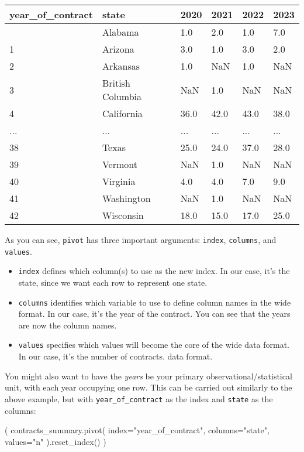 \documentclass[
  letterpaper,
  DIV=11,
  numbers=noendperiod]{scrreprt}
\newenvironment{Shaded}{\begin{snugshade}}{\end{snugshade}}
\newcommand{\NormalTok}[1]{\textcolor[rgb]{0.00,0.23,0.31}{#1}}
\newcommand{\OperatorTok}[1]{\textcolor[rgb]{0.37,0.37,0.37}{#1}}
\newcommand{\StringTok}[1]{\textcolor[rgb]{0.13,0.47,0.30}{#1}}
\providecommand{\tightlist}{%
  \setlength{\itemsep}{0pt}\setlength{\parskip}{0pt}}\usepackage{longtable,booktabs,array}
\begin{document}
\begin{longtable}[]{@{}llllll@{}}
\toprule\noalign{}
year\_of\_contract & state & 2020 & 2021 & 2022 & 2023 \\
\midrule\noalign{}
\endhead
\bottomrule\noalign{}
\endlastfoot
0 & Alabama & 1.0 & 2.0 & 1.0 & 7.0 \\
1 & Arizona & 3.0 & 1.0 & 3.0 & 2.0 \\
2 & Arkansas & 1.0 & NaN & 1.0 & NaN \\
3 & British Columbia & NaN & 1.0 & NaN & NaN \\
4 & California & 36.0 & 42.0 & 43.0 & 38.0 \\
... & ... & ... & ... & ... & ... \\
38 & Texas & 25.0 & 24.0 & 37.0 & 28.0 \\
39 & Vermont & NaN & 1.0 & NaN & NaN \\
40 & Virginia & 4.0 & 4.0 & 7.0 & 9.0 \\
41 & Washington & NaN & 1.0 & NaN & NaN \\
42 & Wisconsin & 18.0 & 15.0 & 17.0 & 25.0 \\
\end{longtable}

As you can see, \texttt{pivot} has three important arguments:
\texttt{index}, \texttt{columns}, and \texttt{values}.

\begin{itemize}
\tightlist
\item
  \texttt{index} defines which column(s) to use as the new index. In our
  case, it's the state, since we want each row to represent one state.
\item
  \texttt{columns} identifies which variable to use to define column
  names in the wide format. In our case, it's the year of the contract.
  You can see that the years are now the column names.
\item
  \texttt{values} specifies which values will become the core of the
  wide data format. In our case, it's the number of contracts. data
  format.
\end{itemize}

You might also want to have the \emph{years} be your primary
observational/statistical unit, with each year occupying one row. This
can be carried out similarly to the above example, but with
\texttt{year\_of\_contract} as the index and \texttt{state} as the
columns:

\begin{Shaded}
\begin{Highlighting}[]
\NormalTok{(}
\NormalTok{    contracts\_summary.pivot(}
\NormalTok{        index}\OperatorTok{=}\StringTok{"year\_of\_contract"}\NormalTok{, columns}\OperatorTok{=}\StringTok{"state"}\NormalTok{, values}\OperatorTok{=}\StringTok{"n"}
\NormalTok{    ).reset\_index()}
\NormalTok{)}
\end{Highlighting}
\end{Shaded}
\end{document}
